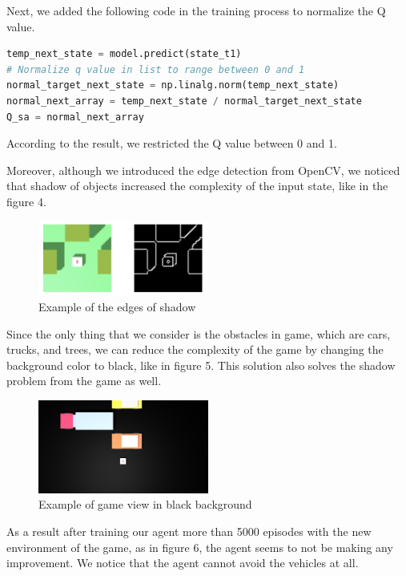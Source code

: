 \documentclass{article}
\begin{document}
Next, we added the following code in the training process to normalize the Q value.
\begin{lstlisting}[language=Python]
temp_next_state = model.predict(state_t1)
# Normalize q value in list to range between 0 and 1
normal_target_next_state = np.linalg.norm(temp_next_state)
normal_next_array = temp_next_state / normal_target_next_state
Q_sa = normal_next_array   
\end{lstlisting}

According to the result, we restricted the Q value between 0 and 1. \par 

Moreover, although we introduced the edge detection from OpenCV, we noticed that shadow of objects increased the complexity of the input state, like in the figure 4.

\begin{figure}[h]
    \caption{Example of the edges of shadow}
    \centering
    \includegraphics[width=0.5\textwidth]{ShadowEdge.png}
\end{figure}

Since the only thing that we consider is the obstacles in game, which are cars, trucks, and trees, we can reduce the complexity of the game by changing the background color to black, like in figure 5. This solution also solves the shadow problem from the game as well. \par 

\begin{figure}[h]
    \caption{Example of game view in black background}
    \centering
    \includegraphics[width=0.5\textwidth]{blackground.png}
\end{figure}

As a result after training our agent more than 5000 episodes with the new environment of the game, as in figure 6, the agent seems to not be making any improvement. We notice that the agent cannot avoid the vehicles at all. \par 
\end{document}
